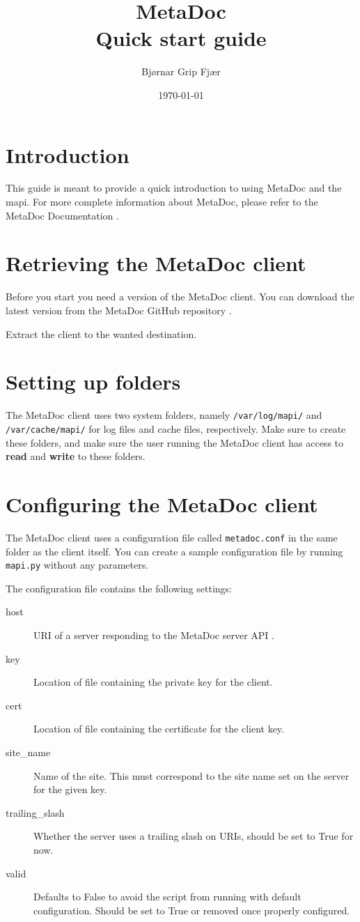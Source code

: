 \documentclass[titlepage, a4paper,10pt]{article}
\title{MetaDoc\\Quick start guide}
\author{Bjørnar Grip Fjær}
\date{\today}
\begin{document}
\maketitle

\section{Introduction}
This guide is meant to provide a quick introduction to using MetaDoc and the
\gls{mapi}. For more complete information about MetaDoc, please refer to the
MetaDoc Documentation \cite{mdoc}.

\section{Retrieving the MetaDoc client}
Before you start you need a version of the MetaDoc client. You can download the
latest version from the MetaDoc GitHub repository \cite{downloads}.

Extract the client to the wanted destination. 

\section{Setting up folders}
The MetaDoc client uses two system folders, namely \texttt{/var/log/mapi/} and
\texttt{/var/cache/mapi/} for log files and cache files, respectively. Make
sure to create these folders, and make sure the user running the MetaDoc client
has access to \textbf{read} and \textbf{write} to these folders. 

\section{Configuring the MetaDoc client}
The MetaDoc client uses a configuration file called \texttt{metadoc.conf} in
the same folder as the client itself. You can create a sample configuration
file by running \texttt{mapi.py} without any parameters. 

The configuration file contains the following settings:

\begin{description}
    \item[host] URI of a server responding to the MetaDoc server API
        \cite{mdoc}.
    \item[key]  Location of file containing the private key for the client.
    \item[cert] Location of file containing the certificate for the client key.
    \item[site\_name]   Name of the site. This must correspond to the site name
        set on the server for the given key.
    \item[trailing\_slash]   Whether the server uses a trailing slash on URIs,
        should be set to True for now.
    \item[valid]    Defaults to False to avoid the script from running with
        default configuration. Should be set to True or removed once properly
        configured.
\end{description}
\end{document}
